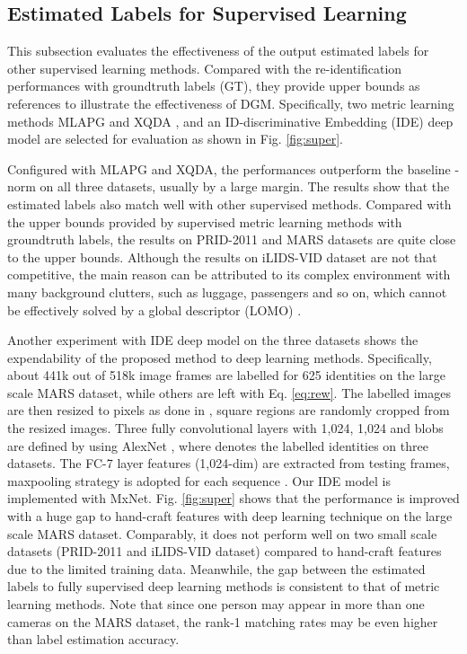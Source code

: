 \documentclass[10pt,twocolumn,letterpaper]{article}
\begin{document}
\subsection{Estimated Labels for Supervised Learning}\label{sec:exp_ml}
This subsection evaluates the effectiveness of the output estimated labels for other supervised learning methods. Compared with the re-identification performances with groundtruth labels (GT), they provide upper bounds as references to illustrate the effectiveness of DGM.
Specifically, two metric learning methods MLAPG \cite{iccv15liao} and XQDA \cite{cvpr15lomo}, and an ID-discriminative Embedding (IDE) deep model \cite{eccv16mars} are selected for evaluation as shown in Fig. \ref{fig:super}.

Configured with MLAPG and XQDA, the performances outperform the baseline -norm on all three datasets, usually by a large margin. The results show that the estimated labels also match well with other supervised methods. Compared with the upper bounds provided by supervised metric learning methods with groundtruth labels, the results on PRID-2011 and MARS datasets are quite close to the upper bounds. Although the results on iLIDS-VID dataset are not that competitive, the main reason can be attributed to its complex environment with many background clutters, such as luggage, passengers and so on, which cannot be effectively solved by a global descriptor (LOMO) \cite{cvpr15lomo}.

Another experiment with IDE deep model on the three datasets shows the expendability of the proposed method to deep learning methods. Specifically, about 441k out of 518k image frames are labelled for 625 identities on the large scale MARS dataset, while others are left with Eq. \ref{eq:rew}. The labelled images are then resized to  pixels as done in \cite{eccv16mars}, square regions  are randomly cropped from the resized images. Three fully convolutional layers with 1,024, 1,024 and  blobs are defined by using AlexNet \cite{nips12alex}, where  denotes the labelled identities on three datasets. The FC-7 layer features (1,024-dim) are extracted from testing frames, maxpooling strategy is adopted for each sequence \cite{eccv16mars}. Our IDE model is implemented with MxNet. Fig. \ref{fig:super} shows that the performance is improved with a huge gap to hand-craft features with deep learning technique on the large scale MARS dataset. Comparably, it does not perform well on two small scale datasets (PRID-2011 and iLIDS-VID dataset) compared to hand-craft features due to the limited training data. Meanwhile, the gap between the estimated labels to fully supervised deep learning methods is consistent to that of metric learning methods. Note that since one person may appear in more than one cameras on the MARS dataset, the rank-1 matching rates may be even higher than label estimation accuracy.
\end{document}
